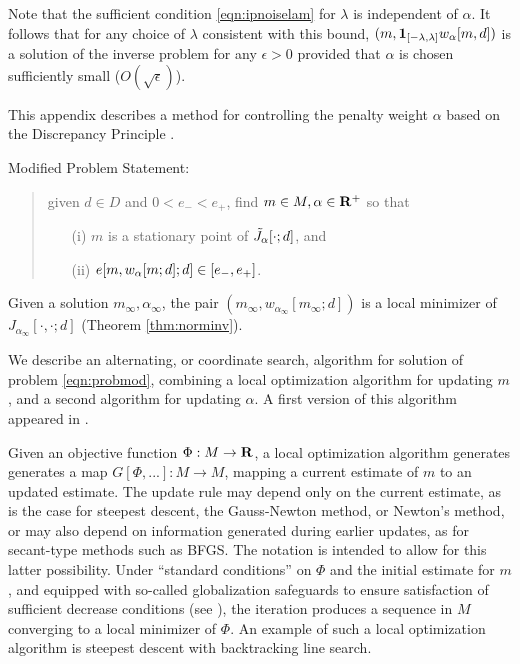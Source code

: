  Note that the sufficient condition \ref{eqn:ipnoiselam} for
$\lambda$ is independent of $\alpha$. It follows that for any choice
of $\lambda$ consistent with this bound, $(m,{\bf
  1}_{[-\lambda,\lambda]}w_{\alpha}[m,d])$ is a solution of the inverse
problem for any $\epsilon > 0$ provided that $\alpha$ is chosen
sufficiently small ($O(\sqrt{\epsilon})$).





This appendix describes a method for controlling the penalty
weight $\alpha$ based on the Discrepancy Principle
\cite[]{EnglHankeNeubauer,FuSymes2017discrepancy}.

Modified Problem Statement:
\begin{quote}
  \label{eqn:probmod}
  given $d \in D$ and $0 < e_- < e_+$,  find  $m \in M, \alpha \in {\bf R}^+$ so that
  \begin{itemize}
  \item[(i) ]$m$ is a stationary point of $\tilde{J}_{\alpha}[\cdot;d]$, and
  \item[(ii) ]$e[m,w_{\alpha}[m;d];d] \in [e_-,e_+]$.
  \end{itemize}
\end{quote}

 Given a solution $m_{\infty}, \alpha_{\infty}$, the pair
$(m_{\infty},w_{\alpha_{\infty}}[m_{\infty};d])$ is a local minimizer
of $J_{\alpha_{\infty}}[\cdot,\cdot;d]$ (Theorem \ref{thm:norminv}).

We describe an alternating, or coordinate search, algorithm for
solution of problem \ref{eqn:probmod}, combining a local optimization
algorithm for updating $m$, and a second algorithm for updating
$\alpha$. A first version of this algorithm appeared in \cite{FuSymes2017discrepancy}.

Given an
objective function $\Phi: M \rightarrow {\bf R}$, a local optimization algorithm generates 
generates a map $G[\Phi,...]: M \rightarrow M$, mapping a current estimate
of $m$ to an updated estimate. The update rule may depend only on the
current estimate, as is the case for steepest descent, the
Gauss-Newton method, or Newton's method, or may also depend on
information generated during earlier updates, as for secant-type
methods such as BFGS. The notation is intended to allow for this
latter possibility. Under ``standard conditions'' on $\Phi$ and the initial estimate for
$m$, and equipped with so-called globalization safeguards to ensure
satisfaction of sufficient decrease conditions
(see \cite{NocedalWright}), the iteration produces a sequence in $M$
converging to a local minimizer of $\Phi$. An example of such a local
optimization algorithm is steepest descent with backtracking line
search.

